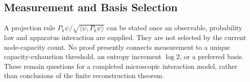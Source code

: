 \subsection{Measurement and Basis Selection}
\label{subsec:measurement}
A projection rule $P_k\psi/\sqrt{\langle\psi,P_k\psi\rangle}$ can be stated once an observable, probability law and apparatus interaction are supplied. They are not selected by the current node-capacity count. No proof presently connects measurement to a unique capacity-exhaustion threshold, an entropy increment $\log2$, or a preferred basis. These remain questions for a completed microscopic interaction model, rather than conclusions of the finite reconstruction theorem.
